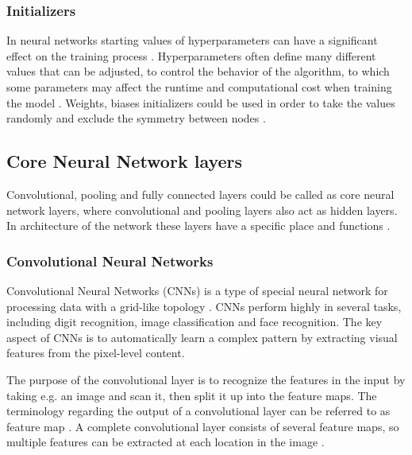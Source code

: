 \subsubsection{Initializers}
In neural networks starting values of hyperparameters can have a significant effect on the training process \citep{Bengio2012}. Hyperparameters often define many different values that can be adjusted, to control the behavior of the algorithm, to which some parameters may affect the runtime and computational cost when training the model \citep{Goodfellow2016}. Weights, biases initializers could be used in order to take the values randomly and exclude the symmetry between nodes \citep{Gustafson1998}. 

\subsection{Core Neural Network layers}\label{sec:Layers}
Convolutional, pooling and fully connected layers could be called as core neural network layers, where convolutional and pooling layers also act as hidden layers. In architecture of the network these layers have a specific place and functions \citep{LeCun2015,Goodfellow2016}.

\subsubsection{Convolutional Neural Networks}
Convolutional Neural Networks (CNNs) is a type of special neural network for processing data with a grid-like topology \citep{Goodfellow2016}. CNNs perform highly in several tasks, including digit recognition, image classification and face recognition. The key aspect of CNNs is to automatically learn a complex pattern by extracting visual features from the pixel-level content.\citep{Acquarelli2017,LeCun1998}

\noindent
The purpose of the convolutional layer is to recognize the features in the input by taking e.g. an image and scan it, then split it up into the feature maps. The terminology regarding the output of a convolutional layer can be referred to as feature map \citep{Goodfellow2016,LeCun1998}. A complete convolutional layer consists of several feature maps, so multiple features can be extracted at each location in the image \citep{LeCun1998}. 


